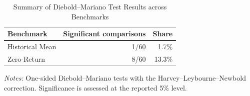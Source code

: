 \documentclass[12pt,twoside]{ord}
\begin{document}
\begin{table}[htbp]
\centering
\caption{Summary of Diebold--Mariano Test Results across Benchmarks}
\label{tab:dm_benchmark_summary}
\small
\begin{tabular}{lrr}
\hline
\textbf{Benchmark} & \textbf{Significant comparisons} & \textbf{Share} \\
\hline
Historical Mean & 1/60 & 1.7\% \\
Zero-Return     & 8/60 & 13.3\% \\
\hline
\end{tabular}
\par\vspace{4pt}\parbox{\linewidth}{\fontsize{9pt}{12pt}\selectfont\textit{Notes:} One-sided Diebold--Mariano tests with the Harvey--Leybourne--Newbold correction. Significance is assessed at the reported 5\% level.}
\end{table}
\end{document}

